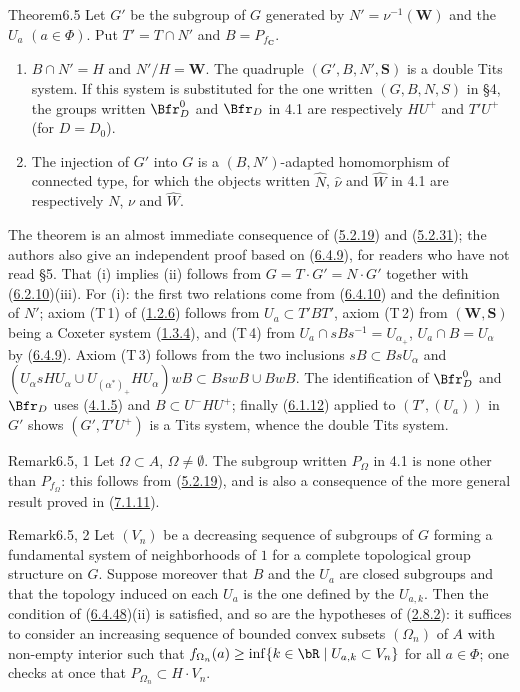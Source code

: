 \documentclass[12pt,a4paper,oneside,english]{smfart}
\newcommand{\btref}[1]{\hyperlink{bt:#1}{#1}}
\theoremstyle{definition}
\theoremstyle{bt}
\begin{document}
\begin{bt}{Theorem}{6.5}
Let $G'$ be the subgroup of $G$ generated by $N'=\nu^{-1}(\mathbf{W})$
and the $U_a$ $(a\in\Phi)$. Put $T'=T\cap N'$ and $B=P_{f_{\mathbf{C}}}$.
\begin{enumerate}
\item[(i)] $B\cap N'=H$ and $N'/H=\mathbf{W}$. The quadruple
  $(G',B,N',\mathbf{S})$ is a double Tits system. If this system is
  substituted for the one written $(G,B,N,S)$ in \S4, the groups written
  $\Bfr^{0}_{D}$ and $\Bfr_{D}$ in 4.1 are respectively $HU^{+}$ and
  $T'U^{+}$ (for $D=D_0$).
\item[(ii)] The injection of $G'$ into $G$ is a $(B,N')$-adapted
  homomorphism of connected type, for which the objects written
  $\widehat{N}$, $\widehat{\nu}$ and $\widehat{W}$ in 4.1 are
  respectively $N$, $\nu$ and $\widehat{W}$.
\end{enumerate}
\end{bt}

\begin{sketch}
The theorem is an almost immediate consequence of (\btref{5.2.19}) and (\btref{5.2.31});
the authors also give an independent proof based on (\btref{6.4.9}), for readers
who have not read \S5. That (i) implies (ii) follows from
$G=T\cdot G'=N\cdot G'$ together with (\btref{6.2.10})(iii). For (i): the first
two relations come from (\btref{6.4.10}) and the definition of $N'$; axiom
(T\,1) of (\btref{1.2.6}) follows from $U_a\subset T'BT'$, axiom (T\,2) from
$(\mathbf{W},\mathbf{S})$ being a Coxeter system (\btref{1.3.4}), and (T\,4) from
$U_a\cap sBs^{-1}=U_{\alpha_{+}}$, $U_a\cap B=U_\alpha$ by (\btref{6.4.9}).
Axiom (T\,3) follows from the two inclusions $sB\subset BsU_\alpha$ and
$(U_\alpha sHU_\alpha\cup U_{(\alpha^{*})_{+}}HU_\alpha)wB\subset
BswB\cup BwB$. The identification of $\Bfr^{0}_{D}$ and $\Bfr_{D}$ uses
(\btref{4.1.5}) and $B\subset U^{-}HU^{+}$; finally (\btref{6.1.12}) applied to
$(T',(U_a))$ in $G'$ shows $(G',T'U^{+})$ is a Tits system, whence the
double Tits system.
\end{sketch}

\begin{bt}{Remark}{6.5, 1}
Let $\Omega\subset A$, $\Omega\ne\emptyset$. The subgroup written
$P_\Omega$ in 4.1 is none other than $P_{f_\Omega}$: this follows from
(\btref{5.2.19}), and is also a consequence of the more general result proved in
(\btref{7.1.11}).
\end{bt}

\begin{bt}{Remark}{6.5, 2}
Let $(V_n)$ be a decreasing sequence of subgroups of $G$ forming a
fundamental system of neighborhoods of $1$ for a complete topological
group structure on $G$. Suppose moreover that $B$ and the $U_a$ are
closed subgroups and that the topology induced on each $U_a$ is the one
defined by the $U_{a,k}$. Then the condition of (\btref{6.4.48})(ii) is
satisfied, and so are the hypotheses of (\btref{2.8.2}): it suffices to consider
an increasing sequence of bounded convex subsets $(\Omega_n)$ of $A$ with
non-empty interior such that
$f_{\Omega_n}(a)\ge\inf\{k\in\bR\mid U_{a,k}\subset V_n\}$ for all
$a\in\Phi$; one checks at once that $P_{\Omega_n}\subset H\cdot V_n$.
\end{bt}
\end{document}
